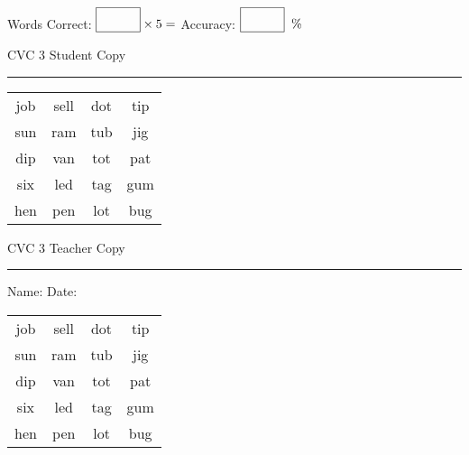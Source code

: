 \documentclass{memoir}
\begin{document}
\normalsize

Words Correct: $\fbox{\phantom{\huge 100}} \times 5 = $ Accuracy: $\fbox{\phantom{\huge 100}}\;\; \%$ 

\vfill

\newpage


\footnotesize \noindent
CVC 3 \hfill Student Copy
\smallskip
\hrule

\huge

\setlength{\tabcolsep}{14pt}
\def\arraystretch{2}

{\selectfont


\begin{vplace}[0.5]
\begin{center}
\begin{tabular}{cccc}
job & sell & dot & tip \\
sun & ram & tub & jig \\
dip & van & tot & pat \\
six & led & tag & gum  \\
hen & pen & lot & bug \\
\end{tabular}
\end{center}
\end{vplace}

}

\newpage

\footnotesize \noindent
CVC 3 \hfill Teacher Copy
\smallskip
\hrule

\normalsize

\vfill

\noindent
Name: \underline{\hspace{1.75in}} \hfill Date: \underline{\hspace{1in}}

\huge

{\selectfont


\begin{vplace}[0.5]
\begin{center}
\begin{tabular}{cccc}
job & sell & dot & tip \\
sun & ram & tub & jig \\
dip & van & tot & pat \\
six & led & tag & gum  \\
hen & pen & lot & bug \\
\end{tabular}
\end{center}
\end{vplace}



}
\end{document}
